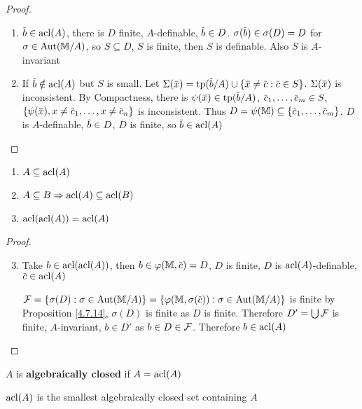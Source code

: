 \documentclass[11pt]{article}
\begin{document}
\begin{proof}
\begin{enumerate}
\item \(\barb\in\acl(A)\), there is \(D\) finite, \(A\)-definable, \(\barb\in D\). \(\sigma(\barb)\in\sigma(D)=D\)
for \(\sigma\in\operatorname{\text{Aut}}(\mathbb{M}/A)\), so \(S\subseteq D\), \(S\) is finite, then \(S\) is definable. Also \(S\) is \(A\)-invariant
\item If \(\barb\notin\acl(A)\) but \(S\) is small.
Let \(\Sigma(\barx)=\tp(\barb/A)\cup\{\barx\neq\barc:\barc\in S\}\). \(\Sigma(\barx)\) is inconsistent. By
Compactness, there
is \(\psi(\barx)\in\tp(\barb/A)\), \(\barc_1,\dots,\barc_m\in S\), \(\{\psi(\barx),x\neq\barc_1,\dots,x\neq\barc_n\}\) is
inconsistent. Thus \(D=\psi(\M)\subseteq\{\barc_1,\dots,\barc_m\}\). \(D\)
is \(A\)-definable, \(\barb\in D\), \(D\) is finite, so \(\barb\in\acl(A)\)
\end{enumerate}
\end{proof}

\begin{proposition}[]
\begin{enumerate}
\item \(A\subseteq\operatorname{acl}(A)\)
\item \(A\subseteq B\Rightarrow\operatorname{acl}(A)\subseteq\operatorname{acl}(B)\)
\item \(\operatorname{acl}(\operatorname{acl}(A))=\operatorname{acl}(A)\)
\end{enumerate}
\end{proposition}

\begin{proof}
\begin{enumerate}
\setcounter{enumi}{2}
\item Take \(b\in\operatorname{acl}(\operatorname{acl}(A))\), then \(b\in\varphi(\M,\barc)=D\), \(D\) is finite, \(D\)
is \(\operatorname{acl}(A)\)-definable, \(\barc\in\acl(A)\)

\(\calf=\{\sigma(D):\sigma\in\Aut(\M/A)\}=\{\varphi(\M,\sigma(\barc)):\sigma\in\Aut(\M/A)\}\) is finite by Proposition
\ref{4.7.14}, \(\sigma(D)\) is finite as \(D\) is finite. Therefore \(D'=\bigcup\mathcal{F}\) is
finite, \(A\)-invariant, \(b\in D'\) as \(b\in D\in\mathcal{F}\). Therefore \(b\in\operatorname{acl}(A)\)
\end{enumerate}
\end{proof}

\begin{definition}[]
\label{4.7.16}
\(A\) is \textbf{algebraically closed} if \(A=\operatorname{acl}(A)\)
\end{definition}

\begin{proposition}[]
\(\operatorname{acl}(A)\) is the smallest algebraically closed set containing \(A\)
\end{proposition}
\end{document}
